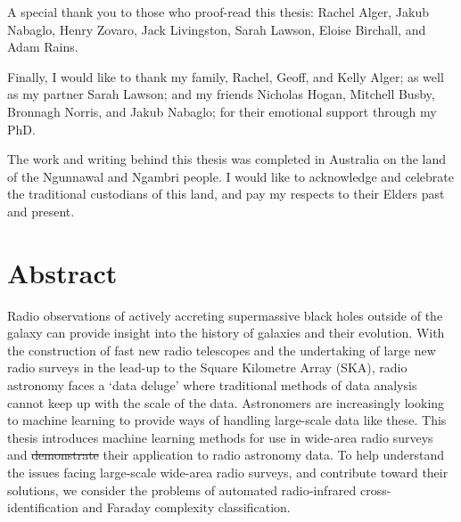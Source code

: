 \documentclass[11pt, a4paper]{book}
\providecommand{\DIFaddtex}[1]{{\protect\color{blue}\uwave{#1}}} %
\providecommand{\DIFdeltex}[1]{{\protect\color{red}\sout{#1}}}                      %
\providecommand{\DIFaddbegin}{} %
\providecommand{\DIFaddend}{} %
\providecommand{\DIFdelbegin}{} %
\providecommand{\DIFdelend}{} %
\providecommand{\DIFadd}[1]{\texorpdfstring{\DIFaddtex{#1}}{#1}} %
\providecommand{\DIFdel}[1]{\texorpdfstring{\DIFdeltex{#1}}{}} %
\newcommand{\DIFscaledelfig}{0.5}
\newlength{\DIFdelgraphicswidth} %
\newlength{\DIFdelgraphicsheight} %
\newcommand{\DIFaddincludegraphics}[2][]{{\color{blue}\fbox{\DIFOincludegraphics[#1]{#2}}}} %
\newcommand{\DIFdelincludegraphics}[2][]{%
\sbox{\DIFdelgraphicsbox}{\DIFOincludegraphics[#1]{#2}}%
\settoboxwidth{\DIFdelgraphicswidth}{\DIFdelgraphicsbox} %
\settoboxtotalheight{\DIFdelgraphicsheight}{\DIFdelgraphicsbox} %
\scalebox{\DIFscaledelfig}{%
\parbox[b]{\DIFdelgraphicswidth}{\usebox{\DIFdelgraphicsbox}\\[-\baselineskip] \rule{\DIFdelgraphicswidth}{0em}}\llap{\resizebox{\DIFdelgraphicswidth}{\DIFdelgraphicsheight}{%
\setlength{\unitlength}{\DIFdelgraphicswidth}%
\begin{picture}(1,1)%
\thicklines\linethickness{2pt} %
{\color[rgb]{1,0,0}\put(0,0){\framebox(1,1){}}}%
{\color[rgb]{1,0,0}\put(0,0){\line( 1,1){1}}}%
{\color[rgb]{1,0,0}\put(0,1){\line(1,-1){1}}}%
\end{picture}%
}\hspace*{3pt}}} %
} %
\DeclareRobustCommand{\DIFaddbegin}{\DIFOaddbegin \let\includegraphics\DIFaddincludegraphics} %
\DeclareRobustCommand{\DIFaddend}{\DIFOaddend \let\includegraphics\DIFOincludegraphics} %
\DeclareRobustCommand{\DIFdelbegin}{\DIFOdelbegin \let\includegraphics\DIFdelincludegraphics} %
\DeclareRobustCommand{\DIFdelend}{\DIFOaddend \let\includegraphics\DIFOincludegraphics} %
\begin{document}
A special thank you to those who proof-read this thesis: Rachel Alger, Jakub Nabaglo, Henry Zovaro, Jack Livingston, Sarah Lawson, Eloise Birchall, and Adam Rains.

Finally, I would like to thank my family, Rachel, Geoff, and Kelly Alger; as well as my partner Sarah Lawson; and my friends Nicholas Hogan, Mitchell Busby, Bronnagh Norris, and Jakub Nabaglo; for their emotional support through my PhD.

\clearpage

The work and writing behind this thesis was completed in Australia on the land of the Ngunnawal and Ngambri people. I would like to acknowledge and celebrate the traditional custodians of this land, and pay my respects to their Elders past and present.


\cleardoublepage
\pagestyle{headings}
\chapter*{Abstract}
\vspace{-1em}

Radio observations of actively accreting supermassive black holes outside of the galaxy can provide insight into the history of galaxies and their evolution. With the construction of fast new radio telescopes and the undertaking of large new radio surveys in the lead-up to the Square Kilometre Array (SKA), radio astronomy faces a `data deluge' where traditional methods of data analysis cannot keep up with the scale of the data. Astronomers are increasingly looking to machine learning to provide ways of handling large-scale data like these. This thesis introduces machine learning methods for use in wide-area radio surveys and \DIFdelbegin \DIFdel{demonstrate }\DIFdelend \DIFaddbegin \DIFadd{demonstrates }\DIFaddend their application to radio astronomy data. To help understand the issues facing large-scale wide-area radio surveys, and contribute toward their solutions, we consider the problems of automated radio-infrared cross-identification and Faraday complexity classification.
\end{document}
